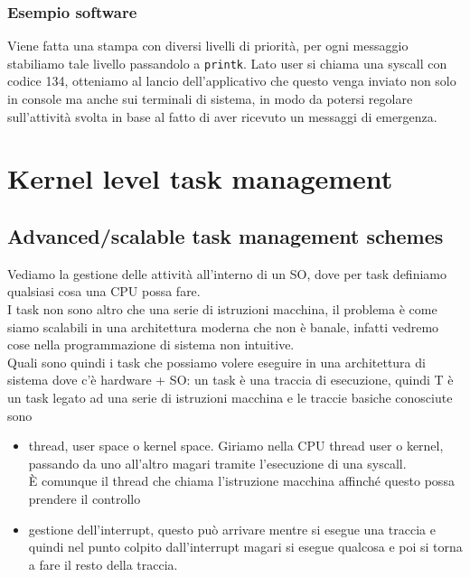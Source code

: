 \documentclass[12pt, oneside]{extbook}
\begin{document}
\subsection{Esempio software}
Viene fatta una stampa con diversi livelli di priorità, per ogni messaggio stabiliamo tale livello passandolo a \texttt{printk}. Lato user si chiama una syscall con codice 134, otteniamo al lancio dell'applicativo che questo venga inviato non solo in console ma anche sui terminali di sistema, in modo da potersi regolare sull'attività svolta in base al fatto di aver ricevuto un messaggi di emergenza.
\chapter{Kernel level task management}
\section{Advanced/scalable task management schemes}
Vediamo la gestione delle attività all'interno di un SO, dove per task definiamo qualsiasi cosa una CPU possa fare.\\I task non sono altro che una serie di istruzioni macchina, il problema è come siamo scalabili in una architettura moderna che non è banale, infatti vedremo cose nella programmazione di sistema non intuitive.\\Quali sono quindi i task che possiamo volere eseguire in una architettura di sistema dove c'è hardware + SO: un task è una traccia di esecuzione, quindi T è un task legato ad una serie di istruzioni macchina e le traccie basiche conosciute sono
\begin{itemize} 
\item thread, user space o kernel space. Giriamo nella CPU thread user o kernel, passando da uno  all'altro magari tramite l'esecuzione di una syscall.\\È comunque il thread che chiama l'istruzione macchina affinché questo possa prendere il controllo
\item gestione dell'interrupt, questo può arrivare mentre si esegue una traccia e quindi nel punto colpito dall'interrupt magari si esegue qualcosa e poi si torna a fare il resto della traccia.
\end{itemize}
\end{document}
